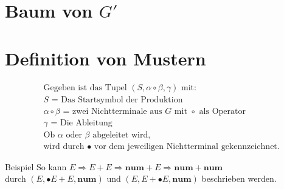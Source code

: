\documentclass[t]{beamer}
\begin{document}
	\section{Baum von $G'$}\label{sec:baum-von-$g'$}
	\begin{frame}

	\end{frame}


	\section{Definition von Mustern}\label{sec:muster}
	\begin{frame}
		\begin{align*}
			&\text{Gegeben ist das Tupel } (S, \alpha \circ \beta, \gamma) \text{ mit:} \\
			&S \text{ = Das Startsymbol der Produktion} \\
			&\alpha \circ \beta \text{ = zwei Nichtterminale aus } G \text{ mit } \circ \text{ als Operator} \\
			&\gamma \text{ = Die Ableitung} \\
			&\text{Ob } \alpha \text{ oder } \beta \text{ abgeleitet wird,} \\
			&\text{wird durch } \bullet \text{ vor dem jeweiligen Nichtterminal gekennzeichnet.}
		\end{align*}
		\begin{exampleblock}{Beispiel}
			So kann $E \Rightarrow E + E \Rightarrow \mathbf{num} + E \Rightarrow \mathbf{num} + \mathbf{num}$ \\ durch
			$(E, \bullet{E}+E, \mathbf{num})$ und $(E, E+\bullet{E}, \mathbf{num})$ beschrieben werden.
		\end{exampleblock}
	\end{frame}
\end{document}
